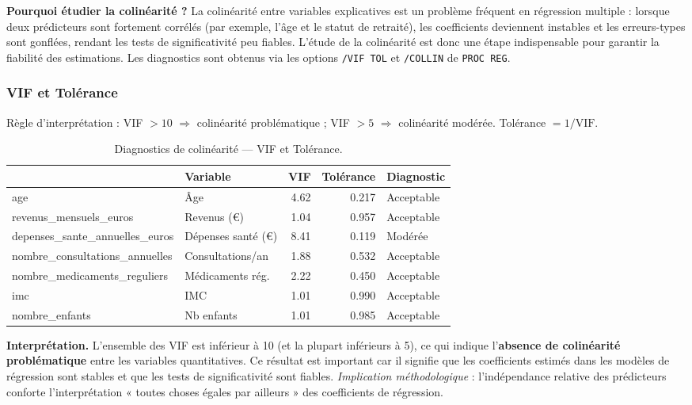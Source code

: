 \documentclass[11pt,a4paper]{memoirerecherche}
\begin{document}
\textbf{Pourquoi étudier la colinéarité ?} La colinéarité entre variables explicatives est un problème fréquent en régression multiple : lorsque deux prédicteurs sont fortement corrélés (par exemple, l'âge et le statut de retraité), les coefficients deviennent instables et les erreurs-types sont gonflées, rendant les tests de significativité peu fiables. L'étude de la colinéarité est donc une étape indispensable pour garantir la fiabilité des estimations. Les diagnostics sont obtenus via les options \texttt{/VIF\ TOL} et \texttt{/COLLIN} de \texttt{PROC\ REG}.

\hypertarget{vif-et-toluxe9rance}{%
\subsubsection{VIF et Tolérance}\label{vif-et-toluxe9rance}}

Règle d'interprétation : VIF \(> 10\) \(\Rightarrow\) colinéarité problématique ; VIF \(> 5\) \(\Rightarrow\) colinéarité modérée. Tolérance \(= 1/\text{VIF}\).

\begin{table}[!h]
\centering
\caption{\label{tab:tab-vif}Diagnostics de colinéarité --- VIF et Tolérance.}
\centering
\fontsize{9}{11}\selectfont
\begin{tabular}[t]{llrrl}
\toprule
  & Variable & VIF & Tolérance & Diagnostic\\
\midrule
age & Âge & 4.62 & 0.217 & Acceptable\\
revenus\_mensuels\_euros & Revenus (€) & 1.04 & 0.957 & Acceptable\\
depenses\_sante\_annuelles\_euros & Dépenses santé (€) & 8.41 & 0.119 & Modérée\\
nombre\_consultations\_annuelles & Consultations/an & 1.88 & 0.532 & Acceptable\\
nombre\_medicaments\_reguliers & Médicaments rég. & 2.22 & 0.450 & Acceptable\\
\addlinespace
imc & IMC & 1.01 & 0.990 & Acceptable\\
nombre\_enfants & Nb enfants & 1.01 & 0.985 & Acceptable\\
\bottomrule
\end{tabular}
\end{table}

\textbf{Interprétation.} L'ensemble des VIF est inférieur à 10 (et la plupart inférieurs à 5), ce qui indique l'\textbf{absence de colinéarité problématique} entre les variables quantitatives. Ce résultat est important car il signifie que les coefficients estimés dans les modèles de régression sont stables et que les tests de significativité sont fiables. \emph{Implication méthodologique} : l'indépendance relative des prédicteurs conforte l'interprétation « toutes choses égales par ailleurs » des coefficients de régression.
\end{document}
